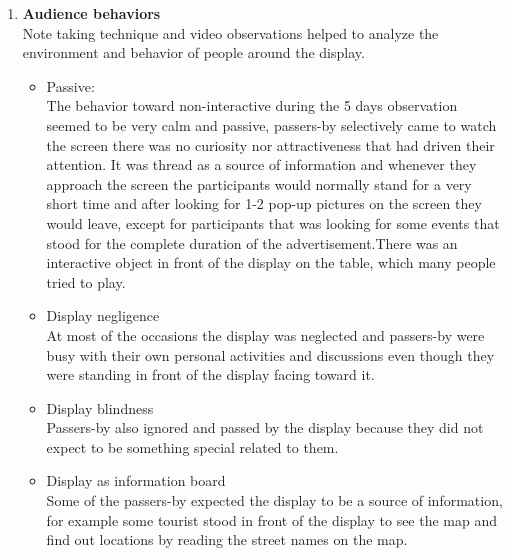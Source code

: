 \begin{enumerate}
\begin{enumerate}
\end{enumerate}


\item \textbf{Audience behaviors} \\
Note taking technique and video observations helped to analyze the environment and behavior of people around the display. 

\begin{itemize}

\item Passive: \\
The behavior toward non-interactive during the 5 days observation seemed to be very calm and passive, passers-by selectively came to watch the screen there was no curiosity nor attractiveness that had driven their attention. It was thread as a source of information and whenever they approach the screen the participants would normally stand for a very short time and after looking for 1-2 pop-up pictures on the screen they would leave, except for participants that was looking for some events that stood for the complete duration of the advertisement.There was an interactive object in front of the display on the table, which many people tried to play.


\item Display negligence  \\
At most of the occasions the display was neglected and passers-by were busy with their own personal activities and discussions even though they were standing in front of the display facing toward it.

\item Display blindness \\
Passers-by also ignored and passed by the display because they did not expect to be something special related to them.

\item Display as information board \\
Some of the passers-by expected the display to be a source of information, for example some tourist stood in front of the display to see the map and find out locations by reading the street names on the map.

\end{itemize}


\end{enumerate}

